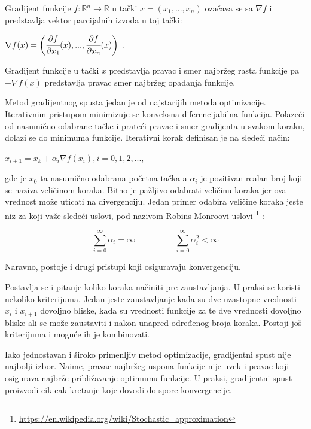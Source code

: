 Gradijent funkcije $f:\mathbb{R}^n \rightarrow \mathbb{R}$ u tački $x=(x_1, ..., x_n)$ ozačava se sa $\nabla f$ i predstavlja vektor parcijalnih izvoda u toj tački:
\begin{center}
	$\nabla f(x) = \bigg( \cfrac{\partial f}{\partial x_1}(x),...,\cfrac{\partial f}{\partial x_n}(x) \bigg)$ .
\end{center}

Gradijent funkcije u tački $x$ predstavlja pravac i smer najbržeg rasta funkcije pa $- \nabla f(x)$ predstavlja pravac smer najbržeg opadanja funkcije. 
\par

Metod gradijentnog spusta jedan je od najstarijih metoda  optimizacije. Iterativnim pristupom minimizuje se konveksna diferencijabilna funkcija. Polazeći od nasumično odabrane tačke i prateći pravac i smer gradijenta u svakom koraku, dolazi se do minimuma funkcije. Iterativni korak definisan je na sledeći način:
\begin{center}
	$ x_{i+1} = x_k + \alpha_i \nabla f(x_i), i=0, 1, 2, ... $,
\end{center}
gde je $x_0$ ta nasumično odabrana početna tačka a $\alpha_i$ je pozitivan realan broj koji se naziva veličinom koraka. Bitno je pažljivo odabrati veličinu koraka jer ova vrednost može uticati na divergenciju. Jedan primer odabira veličine koraka jeste niz za koji važe sledeći uslovi, pod nazivom Robins Monroovi uslovi \footnote{\url{https://en.wikipedia.org/wiki/Stochastic_approximation}} :

\begin{center}
	$$ \sum_{i=0}^{\infty} \alpha_i = \infty \hspace{2cm} \sum_{i=0}^{\infty} \alpha_i^2 < \infty $$ 
\end{center}

Naravno, postoje i drugi pristupi koji osiguravaju konvergenciju.
\par
Postavlja se i pitanje koliko koraka načiniti pre zaustavljanja. U praksi se koristi nekoliko kriterijuma. Jedan jeste zaustavljanje kada su dve uzastopne vrednosti $x_i$ i $x_{i+1}$ dovoljno bliske, kada su vrednosti funkcije za te dve vrednosti dovoljno bliske ali se može zaustaviti i nakon unapred određenog broja koraka. Postoji još kriterijuma i moguće ih je kombinovati.
\par
Iako jednostavan i široko primenljiv metod optimizacije, gradijentni spust nije najbolji izbor. Naime, pravac najbržeg uspona funkcije nije uvek i pravac koji osigurava najbrže približavanje optimumu funkcije. U praksi, gradijentni spust proizvodi cik-cak kretanje koje dovodi do spore konvergencije.

